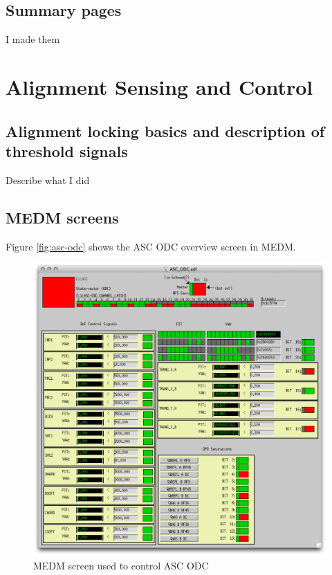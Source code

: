 \subsection{Summary pages}
I made them

\section{Alignment Sensing and Control}

\subsection{Alignment locking basics and description of threshold signals}

Describe what I did

\subsection{MEDM screens}

Figure \ref{fig:asc-odc} shows the ASC ODC overview screen in MEDM.

\begin{figure}[ht!]
\includegraphics[width=\textwidth]{figures/ODC/ASC_screen}
\caption[ASC ODC Overview Screen]{MEDM screen used to control ASC ODC}
\end{figure}\label{fig:asc-odc}


